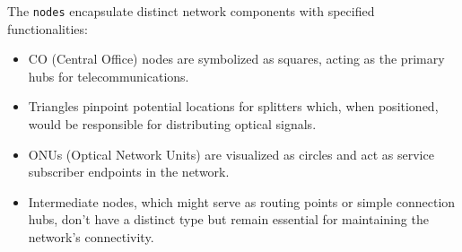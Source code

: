 \documentclass{article}
\begin{document}
The \texttt{nodes} encapsulate distinct network components with specified functionalities:
\begin{itemize}
    \item CO (Central Office) nodes are symbolized as squares, acting as the primary hubs for telecommunications.
    \item Triangles pinpoint potential locations for splitters which, when positioned, would be responsible for distributing optical signals.
    \item ONUs (Optical Network Units) are visualized as circles and act as service subscriber endpoints in the network.
    \item Intermediate nodes, which might serve as routing points or simple connection hubs, don't have a distinct type but remain essential for maintaining the network's connectivity.
\end{itemize}
\end{document}
